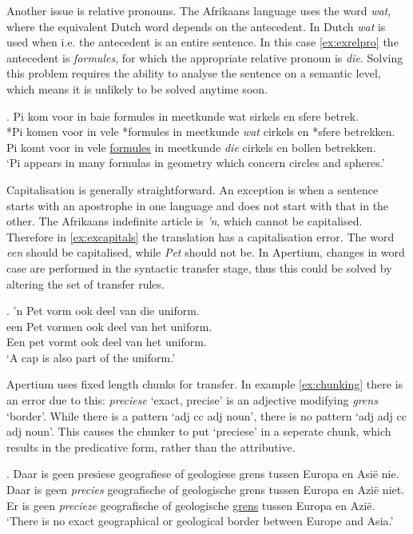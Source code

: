 \documentclass[11pt]{article}
\begin{document}
Another issue is relative pronouns. The Afrikaans language uses the word {\em wat}, where the equivalent
Dutch word depends on the antecedent. In Dutch {\em wat} is used when i.e. the antecedent
is an entire sentence. In this case \ref{ex:exrelpro} the antecedent is {\em formules}, for which the appropriate
relative pronoun is {\em die}. Solving this problem requires the ability to analyse the
sentence on a semantic level, which means it is unlikely to be solved anytime soon.

\ex. \label{ex:exrelpro}
    Pi kom voor in baie formules in meetkunde wat sirkels en sfere betrek. \\
    *Pi komen voor in vele *formules in meetkunde {\em wat} cirkels en *sfere betrekken. \\
    Pi komt voor in vele \underline{formules} in meetkunde {\em die} cirkels en bollen betrekken. \\
    `Pi appears in many formulas in geometry which concern circles and spheres.' 

Capitalisation is generally straightforward. An exception is when a sentence
starts with an apostrophe in one language and does not start with that in the other. The Afrikaans
indefinite article is \emph{'n}, which cannot be capitalised. Therefore in \ref{ex:excapitals} the translation has a 
capitalisation error. The word \emph{een} should be capitalised, while \emph{Pet} should not 
be. In Apertium, changes in word case are performed in the syntactic transfer stage, thus this 
could be solved by altering the set of transfer rules.

\ex. \label{ex:excapitals} 
    'n Pet vorm ook deel van die uniform. \\
    een Pet vormen ook deel van het uniform. \\
    Een pet vormt ook deel van het uniform. \\
    `A cap is also part of the uniform.' 

Apertium uses fixed length chunks for transfer. In example \ref{ex:chunking} there is an error
due to this: \emph{preciese} `exact, precise' is an adjective modifying \emph{grens} `border'. While 
there is a pattern
`adj cc adj noun', there is no pattern `adj adj cc adj noun'. This causes the chunker to put
`preciese' in a seperate chunk, which results in the predicative form, rather than the attributive.

\ex. \label{ex:chunking}
    Daar is geen presiese geografiese of geologiese grens tussen Europa en Asië nie. \\
    Daar is geen {\em precies} geografische of geologische grens tussen Europa en Azië niet. \\ 
    Er is geen {\em precieze} geografische of geologische \underline{grens} tussen Europa en Azië. \\
    `There is no exact geographical or geological border between Europe and Asia.' 
\end{document}
